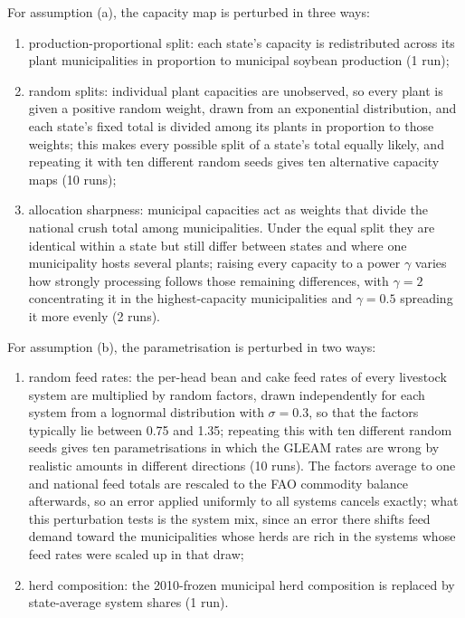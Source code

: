 \documentclass[pdflatex,sn-nature]{sn-jnl}%
\begin{document}
For assumption (a), the capacity map is perturbed in three ways:
\begin{enumerate}
\item production-proportional split: each state's capacity is
redistributed across its plant municipalities in proportion to
municipal soybean production (1 run);
\item random splits: individual plant capacities are unobserved, so
every plant is given a positive random weight, drawn from an
exponential distribution, and each state's fixed total is divided
among its plants in proportion to those weights; this makes every
possible split of a state's total equally likely, and repeating it
with ten different random seeds gives ten alternative capacity maps
(10 runs);
\item allocation sharpness: municipal capacities act as weights that
divide the national crush total among municipalities. Under the equal
split they are identical within a state but still differ between
states and where one municipality hosts several plants; raising every
capacity to a power $\gamma$ varies how strongly processing follows
those remaining differences, with $\gamma=2$ concentrating it in the
highest-capacity municipalities and $\gamma=0.5$ spreading it more
evenly (2 runs).
\end{enumerate}

For assumption (b), the parametrisation is perturbed in two ways:
\begin{enumerate}
\item random feed rates: the per-head bean and cake feed rates of every
livestock system are multiplied by random factors, drawn independently
for each system from a lognormal distribution with $\sigma=0.3$, so
that the factors typically lie between 0.75 and 1.35; repeating this
with ten different random seeds gives ten
parametrisations in which the GLEAM rates are wrong by realistic
amounts in different directions (10 runs). The factors average to one
and national feed totals are rescaled to the FAO commodity balance
afterwards, so an error applied uniformly to all systems cancels
exactly; what this perturbation tests is the system mix, since an error
there shifts feed demand toward the municipalities whose herds are rich
in the systems whose feed rates were scaled up in that draw;
\item herd composition: the 2010-frozen municipal herd composition is
replaced by state-average system shares (1 run).
\end{enumerate}
\end{document}
